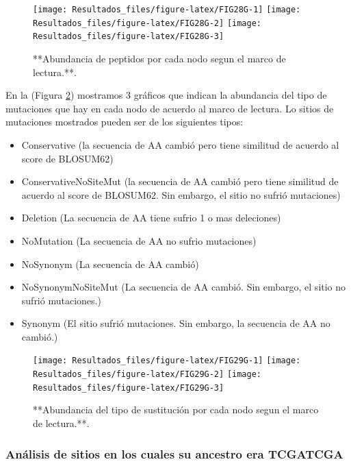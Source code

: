 \documentclass[
]{book}
\providecommand{\tightlist}{%
  \setlength{\itemsep}{0pt}\setlength{\parskip}{0pt}}
\begin{document}
\begin{figure}

{\centering \texttt{[image: Resultados\_files/figure-latex/FIG28G-1]} \texttt{[image: Resultados\_files/figure-latex/FIG28G-2]} \texttt{[image: Resultados\_files/figure-latex/FIG28G-3]} 

}

\caption{**Abundancia de peptidos por cada nodo segun el marco de lectura.**.}\label{fig:FIG28G}
\end{figure}

En la (Figura \ref{fig:FIG29G}) mostramos 3 gráficos que indican la abundancia del tipo de mutaciones que hay en cada nodo de acuerdo al marco de lectura. Lo sitios de mutaciones mostrados pueden ser de los siguientes tipos:

\begin{itemize}
\tightlist
\item
  Conservative (la secuencia de AA cambió pero tiene similitud de acuerdo al score de BLOSUM62)
\item
  ConservativeNoSiteMut (la secuencia de AA cambió pero tiene similitud de acuerdo al score de BLOSUM62. Sin embargo, el sitio no sufrió mutaciones)
\item
  Deletion (La secuencia de AA tiene sufrio 1 o mas deleciones)
\item
  NoMutation (La secuencia de AA no sufrio mutaciones)
\item
  NoSynonym (La secuencia de AA cambió)
\item
  NoSynonymNoSiteMut (La secuencia de AA cambió. Sin embargo, el sitio no sufrió mutaciones.)
\item
  Synonym (El sitio sufrió mutaciones. Sin embargo, la secuencia de AA no cambió.)
\end{itemize}

\begin{figure}

{\centering \texttt{[image: Resultados\_files/figure-latex/FIG29G-1]} \texttt{[image: Resultados\_files/figure-latex/FIG29G-2]} \texttt{[image: Resultados\_files/figure-latex/FIG29G-3]} 

}

\caption{**Abundancia del tipo de sustitución por cada nodo segun el marco de lectura.**.}\label{fig:FIG29G}
\end{figure}

\hypertarget{anuxe1lisis-de-sitios-en-los-cuales-su-ancestro-era-tcgatcga}{%
\subsubsection{Análisis de sitios en los cuales su ancestro era TCGATCGA}\label{anuxe1lisis-de-sitios-en-los-cuales-su-ancestro-era-tcgatcga}}
\end{document}
